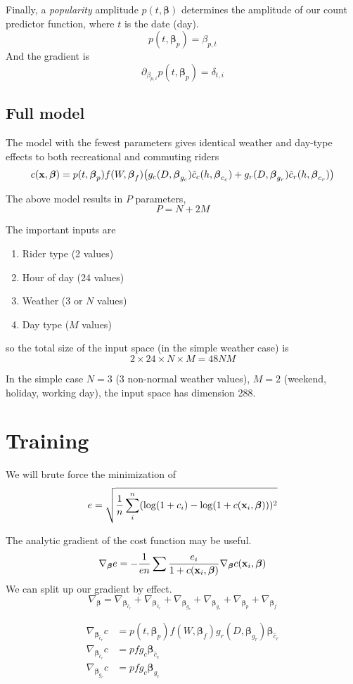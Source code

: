 \documentclass{article}
\newcommand{\bx}{{\bf x}}
\newcommand{\bbeta}{\boldsymbol\beta}
\begin{document}
Finally, a {\it popularity} amplitude $p(t, \bbeta)$ determines the amplitude of our
count predictor function, where $t$ is the date (day).
\[
p(t, \bbeta_p) = \beta_{p,t}
\]
And the gradient is
\[
\partial_{\beta_{p,i}} p(t, \bbeta_p) = \delta_{t,i}
\]


\subsection*{Full model}

The model with the fewest parameters gives identical weather and
day-type effects to both recreational and commuting riders
\[
c(\bx, \bbeta) = p(t, \bbeta_p) f(W, \bbeta_f)
\big( g_c(D, \bbeta_{g_c}) \hat{c}_c(h, \bbeta_{c_c}) + g_r(D,
\bbeta_{g_r}) \hat{c}_r(h, \bbeta_{c_r}) \big)
\]

The above model results in $P$ parameters,
\[
P = N + 2 M
\]


The important inputs are
\begin{enumerate}
  \item Rider type (2 values)
  \item Hour of day (24 values)
  \item Weather (3 or $N$ values)
  \item Day type ($M$ values)
\end{enumerate}
so the total size of the input space (in the simple weather case) is
\[
2 \times 24 \times N \times M = 48 N M
\]

In the simple case $N=3$ (3 non-normal weather values), $M=2$
(weekend, holiday, working day), the input space has dimension
288.

\section*{Training}

We will brute force the minimization of
\[
e = \sqrt{\frac{1}{n} \sum_i^n (\log (1 + c_i) - \log(1 + c(\bx_i,
\bbeta)))^2}
\]

The analytic gradient of the cost function may be useful.
\[
\nabla_{\bbeta} e = - \frac{1}{e n} \sum \frac{e_i}{1 + c(\bx_i,
\bbeta)} \nabla_{\bbeta} c(\bx_i, \bbeta)
\]
We can split up our gradient by effect.
\[
\nabla_{\bbeta} =
\nabla_{\bbeta_{\hat{c}_c}} +
\nabla_{\bbeta_{\hat{c}_r}} +
\nabla_{\bbeta_{g_c}} +
\nabla_{\bbeta_{g_r}} +
\nabla_{\bbeta_{p}} +
\nabla_{\bbeta_{f}}
\]

\begin{align}
\nabla_{\bbeta_{\hat{c}_r}} c &=
p(t, \bbeta_p) f(W, \bbeta_f) g_r(D, \bbeta_{g_r}) \bbeta_{\hat{c}_r}
\\
\nabla_{\bbeta_{\hat{c}_c}} c &=
p f g_c \bbeta_{\hat{c}_c}
\\
\nabla_{\bbeta_{g_c}} c &=
p f g_c \bbeta_{g_c}
\end{align}
\end{document}
